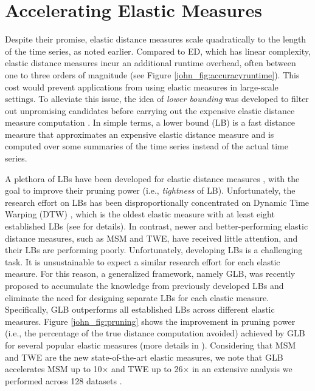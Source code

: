\documentclass[11pt]{article}
\begin{document}
\section{Accelerating Elastic Measures}
\label{john_sec:accelerating}

Despite their promise, elastic distance measures scale quadratically to the length of the time series, as noted earlier. Compared to ED, which has linear complexity, elastic distance measures incur an additional runtime overhead, often between one to three orders of magnitude (see Figure \ref{john_fig:accuracyruntime}). This cost would prevent applications from using elastic measures in large-scale settings. To alleviate this issue, the idea of {\em lower bounding} was developed to filter out unpromising candidates before carrying out the expensive elastic distance measure computation \cite{kim2001index,keogh2005exact,Faloutsos1994fast}. In simple terms, a lower bound (LB) is a fast distance measure that approximates an expensive elastic distance measure and is computed over some summaries of the time series instead of the actual time series. 

A plethora of LBs have been developed for elastic distance measures \cite{kim2001index,keogh2005exact,shen2018accelerating, tan2020fastee,lemire2009faster,tan2019elastic,chen2004marriage}, with the goal to improve their pruning power (i.e., \textit{tightness} of LB). Unfortunately, the research effort on LBs has been disproportionally concentrated on Dynamic Time Warping (DTW) \cite{sakoe1971dynamic,sakoe1978dynamic}, which is the oldest elastic measure with at least eight established LBs (see \cite{paparrizos2023accelerating} for details). In contrast, newer and better-performing elastic distance measures, such as MSM and TWE, have received little attention, and their LBs are performing poorly. Unfortunately, developing LBs is a challenging task. It is unsustainable to expect a similar research effort for each elastic measure. For this reason, a generalized framework, namely GLB, was recently proposed \cite{paparrizos2023accelerating} to accumulate the knowledge from previously developed LBs and eliminate the need for designing separate LBs for each elastic measure. Specifically, GLB outperforms all established LBs across different elastic measures. Figure \ref{john_fig:pruning} shows the improvement in pruning power (i.e., the percentage of
the true distance computation avoided) achieved by GLB for several popular elastic measures (more details in \cite{paparrizos2023accelerating}). Considering that MSM and TWE are the new state-of-the-art elastic measures, we note that GLB accelerates MSM up to 10$\times$ and TWE up to 26$\times$ in an extensive analysis we performed across 128 datasets \cite{UCRArchive2018}.
\end{document}
